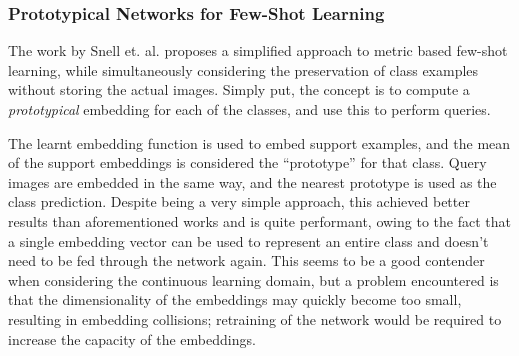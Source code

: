 \documentclass{report}
\begin{document}
\subsubsection{Prototypical Networks for Few-Shot Learning}
The work by Snell et. al. \parencite{prototypical} proposes a simplified approach to metric based few-shot learning, while simultaneously considering the preservation of class examples without storing the actual images. Simply put, the concept is to compute a \emph{prototypical} embedding for each of the classes, and use this to perform queries. \par
The learnt embedding function is used to embed support examples, and the mean of the support embeddings is considered the ``prototype'' for that class. Query images are embedded in the same way, and the nearest prototype is used as the class prediction. Despite being a very simple approach, this achieved better results than aforementioned works and is quite performant, owing to the fact that a single embedding vector can be used to represent an entire class and doesn't need to be fed through the network again. This seems to be a good contender when considering the continuous learning domain, but a problem encountered is that the dimensionality of the embeddings may quickly become too small, resulting in embedding collisions; retraining of the network would be required to increase the capacity of the embeddings. \par
\end{document}
